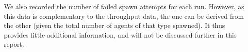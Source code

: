 We also recorded the number of failed spawn attempts for each run. However, as this data is complementary to the throughput data, the one can be derived from the other (given the total number of agents of that type spawned). It thus provides little additional information, and will not be discussed further in this report.